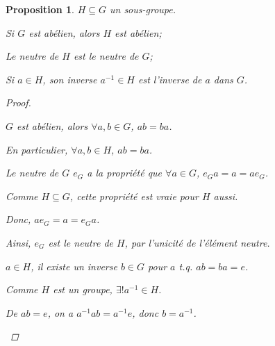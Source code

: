 \documentclass{report}
\newtheorem*{prop}{Proposition}
\theoremstyle{definition}
\theoremstyle{remark}
\begin{document}
	
	\begin{prop}
		$H \subseteq G$ un sous-groupe.
		\begin{nlist}[itemsep=1pt]
			\item Si $G$ est ab\'elien, alors $H$ est ab\'elien;
			\item Le neutre de $H$ est le neutre de $G$;
			\item Si $a \in H$, son inverse $a^{-1}\in H$ est l'inverse de $a$ dans $G$.
		\end{nlist}
		\begin{proof}~

			\begin{nlist}[itemsep=1pt]
				\item $G$ est ab\'elien, alors $\forall a,b \in G$, $ab=ba$.

				En particulier, $\forall a,b \in H$, $ab=ba$.
				\item Le neutre de $G$ $e_G$ a la propri\'et\'e que $\forall a \in G$, $e_Ga=a=ae_G$.

				Comme $H \subseteq G$, cette propri\'et\'e est vraie pour $H$ aussi.

				Donc, $ae_G=a=e_Ga$.

				Ainsi, $e_G$ est le neutre de $H$, par l'unicit\'e de l'\'el\'ement neutre.
				\item $a \in H$, il existe un inverse $b \in G$ pour $a$ t.q. $ab=ba=e$.

				Comme $H$ est un groupe, $\exists! a^{-1} \in H$.

				De $ab=e$, on a $a^{-1}ab=a^{-1}e$, donc $b=a^{-1}$.
			\end{nlist}
		\end{proof}
	\end{prop}
\end{document}
